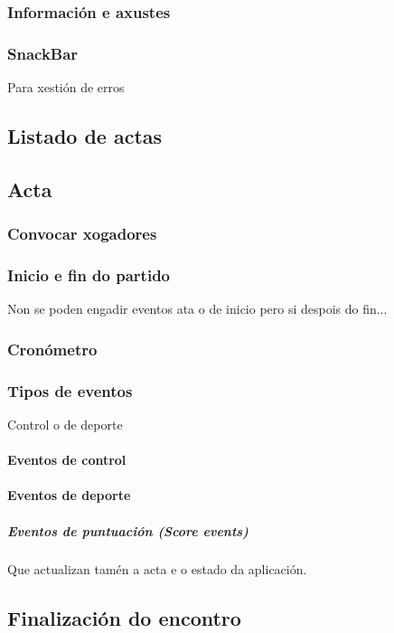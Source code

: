       \subsubsection{Información e axustes}

      \subsubsection{SnackBar}
      Para xestión de erros

    \subsection{Listado de actas}


    \subsection{Acta}

      \subsubsection{Convocar xogadores}

      \subsubsection{Inicio e fin do partido}
      Non se poden engadir eventos ata o de inicio pero si despois do fin...

      \subsubsection{Cronómetro}

      \subsubsection{Tipos de eventos}
    Control o de deporte
      \paragraph{Eventos de control}
      \paragraph{Eventos de deporte}
        \subparagraph{Eventos de puntuación (Score events)}
        Que actualizan tamén a acta e o estado da aplicación.

    \subsection{Finalización do encontro}


